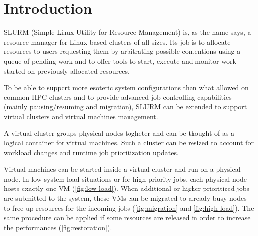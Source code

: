\documentclass[10pt,authoryear]{sigplanconf} %
\begin{document}
\section{Introduction}

SLURM (Simple Linux Utility for Resource Management) is, as the name says, a resource manager for Linux based clusters of all sizes. Its job is to allocate resources to users requesting them by arbitrating possible contentions using a queue of pending work and to offer tools to start, execute and monitor work started on previously allocated resources.

To be able to support more esoteric system configurations than what allowed on common HPC clusters and to provide advanced job controlling capabilities (mainly pausing/resuming and migration), SLURM can be extended to support virtual clusters and virtual machines management.

A virtual cluster groups physical nodes togheter and can be thought of as a logical container for virtual machines. Such a cluster can be resized to account for workload changes and runtime job prioritization updates.

Virtual machines can be started inside a virtual cluster and run on a physical node. In low system load situations or for high priority jobs, each physical node hosts exactly one VM (\autoref{fig:low-load}). When additional or higher prioritized jobs are submitted to the system, these VMs can be migrated to already busy nodes to free up resources for the incoming jobs (\autoref{fig:migration} and \ref{fig:high-load}). The same procedure can be applied if some resources are released in order to increase the performances (\autoref{fig:restoration}).
\end{document}
